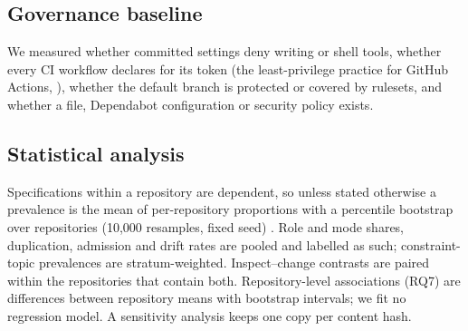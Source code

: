 \subsection{Governance baseline}
\label{sec:governance}

We measured whether committed settings deny writing or shell tools, whether every CI workflow declares
 for its token (the least-privilege practice for GitHub Actions, \citealp{koishybayev2022characterizing}),
whether the default branch is protected or covered by rulesets, and whether a  file, Dependabot
configuration or security policy exists.

\subsection{Statistical analysis}
\label{sec:stats}

Specifications within a repository are dependent, so unless stated otherwise a prevalence is the mean of
per-repository proportions with a percentile bootstrap over repositories (10,000 resamples, fixed seed)
\citep{efron1993bootstrap}. Role and mode shares, duplication, admission and drift rates are pooled and labelled as
such; constraint-topic prevalences are stratum-weighted. Inspect--change contrasts are paired within the repositories
that contain both. Repository-level associations (RQ7) are differences between repository means with bootstrap
intervals; we fit no regression model. A sensitivity analysis keeps one copy per content hash.
